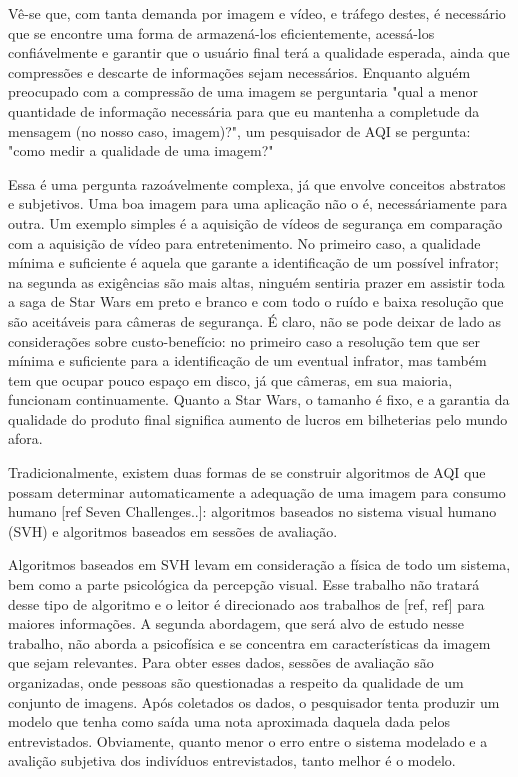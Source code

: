	Vê-se que, com tanta demanda por imagem e vídeo, e tráfego destes, é necessário que se encontre uma forma de armazená-los eficientemente, acessá-los confiávelmente e garantir que o usuário final terá a qualidade esperada, ainda que compressões e descarte de informações sejam necessários. Enquanto alguém preocupado com a compressão de uma imagem se perguntaria "qual a menor quantidade de informação necessária para que eu mantenha a completude da mensagem (no nosso caso, imagem)?", um pesquisador de AQI se pergunta: "como medir a qualidade de uma imagem?"

	Essa é uma pergunta razoávelmente complexa, já que envolve conceitos abstratos e subjetivos. Uma boa imagem para uma aplicação não o é, necessáriamente para outra. Um exemplo simples é a aquisição de vídeos de segurança em comparação com a aquisição de vídeo para entretenimento. No primeiro caso, a qualidade mínima e suficiente é aquela que garante a identificação de um possível infrator; na segunda as exigências são mais altas, ninguém sentiria prazer em assistir toda a saga de Star Wars em preto e branco e com todo o ruído e baixa resolução que são aceitáveis para câmeras de segurança. É claro, não se pode deixar de lado as considerações sobre custo-benefício: no primeiro caso a resolução tem que ser mínima e suficiente para a identificação de um eventual infrator, mas também tem que ocupar pouco espaço em disco, já que câmeras, em sua maioria, funcionam continuamente. Quanto a Star Wars, o tamanho é fixo, e a garantia da qualidade do produto final significa aumento de lucros em bilheterias pelo mundo afora.

	Tradicionalmente, existem duas formas de se construir algoritmos de AQI que possam determinar automaticamente a adequação de uma imagem para consumo humano [ref Seven Challenges..]: algoritmos baseados no sistema visual humano (SVH) e algoritmos baseados em sessões de avaliação.

	Algoritmos baseados em SVH levam em consideração a física de todo um sistema, bem como a parte psicológica da percepção visual. Esse trabalho não tratará desse tipo de algoritmo e o leitor é direcionado aos trabalhos de [ref, ref] para maiores informações. A segunda abordagem, que será alvo de estudo nesse trabalho, não aborda a psicofísica e se concentra em características da imagem que sejam relevantes. Para obter esses dados, sessões de avaliação são organizadas, onde pessoas são questionadas a respeito da qualidade de um conjunto de imagens. Após coletados os dados, o pesquisador tenta produzir um modelo que tenha como saída uma nota aproximada daquela dada pelos entrevistados. Obviamente, quanto menor o erro entre o sistema modelado e a avalição subjetiva dos indivíduos entrevistados, tanto melhor é o modelo.

